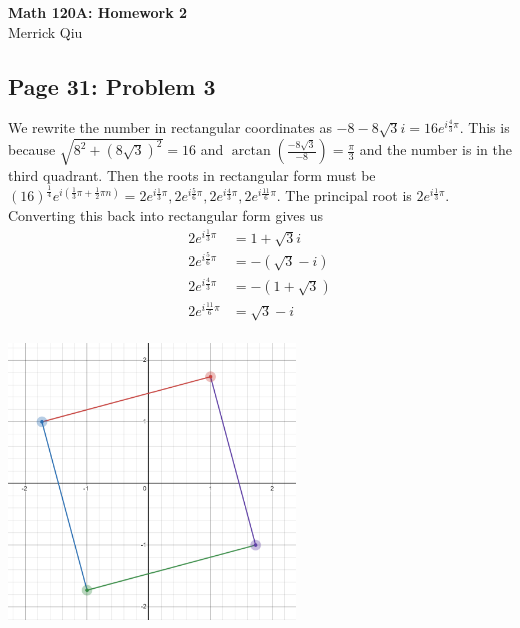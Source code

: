 \documentclass{article}
\begin{document}
\begin{center}
	\huge{\bf Math 120A: Homework 2} \\
	Merrick Qiu
\end{center}
\subsection*{Page 31: Problem 3}
We rewrite the number in rectangular coordinates as 
$-8-8\sqrt{3}i = 16e^{i\frac{4}{3}\pi}$. 
This is because $\sqrt{8^2 + (8\sqrt{3})^2} = 16$
and $\arctan(\frac{-8\sqrt{3}}{-8}) = \frac{\pi}{3}$ 
and the number is in the third quadrant.
Then the roots in rectangular form must be 
$(16)^\frac{1}{4}e^{i\left(\frac{1}{3}\pi + \frac{1}{2}\pi n\right)}
= 2e^{i\frac{1}{3}\pi}, 2e^{i\frac{5}{6}\pi}, 2e^{i\frac{4}{3}\pi}, 2e^{i\frac{11}{6}\pi}$.
The principal root is $2e^{i\frac{1}{3}\pi}$.
Converting this back into rectangular form gives us
\begin{align*}
	2e^{i\frac{1}{3}\pi} &= 1 + \sqrt{3} i\\
	2e^{i\frac{5}{6}\pi} &= -(\sqrt{3} - i)\\
	2e^{i\frac{4}{3}\pi} &= -(1 + \sqrt{3})\\
	2e^{i\frac{11}{6}\pi} &= \sqrt{3} - i\\
\end{align*}
\begin{center}
	\includegraphics[width=3in]{problem1.png}
\end{center}
\end{document}
